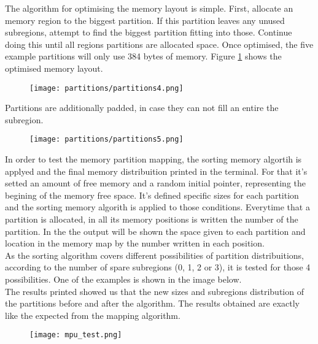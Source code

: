 The algorithm for optimising the memory layout is simple. First, allocate an
memory region to the biggest partition. If this partition leaves any unused
subregions, attempt to find the biggest partition fitting into those. Continue
doing this until all regions partitions are allocated space.
Once optimised, the five example partitions will only use 384 bytes of memory.
Figure \ref{fig:ce4} shows the optimised memory layout.\\
\begin{figure}[H]
\centering
\texttt{[image: partitions/partitions4.png]}
\label{fig:ce4}
\end{figure}
Partitions are additionally padded, in case they can not fill an entire the subregion.\\
\begin{figure}[H]
\centering
\texttt{[image: partitions/partitions5.png]}
\label{fig:ce5}
\end{figure}

In order to test the memory partition mapping, the sorting memory algortih is applyed and the final memory distribuition printed in the terminal. For 
that it's setted an amount of free memory and a random initial pointer, representing the begining of the memory free 
space. It's defined specific sizes for each partition and the sorting memory algorith is applied to those 
conditions. Everytime that a partition is allocated, in all its memory positions is written the number of 
the partition. In the the output will be shown the space given to each partition and location in the 
memory map by the number written in each position.\\
As the sorting algorithm covers different possibilities of partition distribuitions, according to the 
number of spare subregions (0, 1, 2 or 3), it is tested for those 4 possibilities. One of the examples is 
shown in the image below.\\
  The results printed showed us that the new sizes and subregions distribution of the partitions before and after the algorithm. The results obtained are exactly like the expected from the mapping algorithm.

\begin{figure}[H]
\centering
\texttt{[image: mpu\_test.png]}
\label{fig:testing_mpu}
\end{figure}


